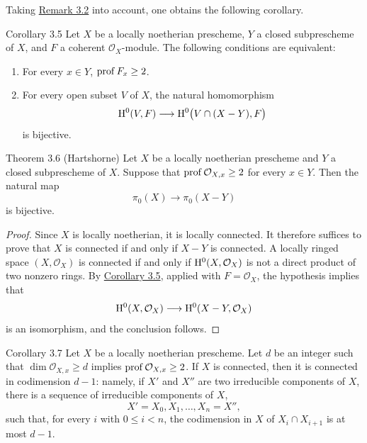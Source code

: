 Taking \hyperref[III.3.2]{Remark 3.2} into account, one obtains the following corollary.


\begin{sgastatement}{Corollary 3.5}
Let $X$ be a locally noetherian prescheme, $Y$ a closed subprescheme of $X$,
and $F$ a coherent $\mathcal O_X$-module. The following conditions are equivalent:
\begin{enumerate}[label=\textup{(\arabic*)},leftmargin=2.8em]
\item For every $x\in Y$, $\operatorname{prof} F_x\ge2$.
\item For every open subset $V$ of $X$, the natural homomorphism
\[
  \mathrm H^0(V,F)\longrightarrow\mathrm H^0\bigl(V\cap(X-Y),F\bigr)
\]
is bijective.
\end{enumerate}
\end{sgastatement}

\begin{sgastatement}{Theorem 3.6 (Hartshorne)}
Let $X$ be a locally noetherian prescheme and $Y$ a closed subprescheme of
$X$. Suppose that $\operatorname{prof}\mathcal O_{X,x}\ge2$ for every $x\in Y$. Then the
natural map
\[
  \pi_0(X)\longrightarrow\pi_0(X-Y)
\]
is bijective.
\end{sgastatement}

\begin{proof}
Since $X$ is locally noetherian, it is locally connected. It therefore
suffices to prove that $X$ is connected if and only if $X-Y$ is connected.
A locally ringed space $(X,\mathcal O_X)$ is connected if and only if
$\mathrm H^0(X,\mathcal O_X)$ is not a direct product of two nonzero rings. By
\hyperref[III.3.5]{Corollary 3.5}, applied with $F=\mathcal O_X$, the hypothesis implies that
\[
  \mathrm H^0(X,\mathcal O_X)\longrightarrow
  \mathrm H^0(X-Y,\mathcal O_X)
\]
is an isomorphism, and the conclusion follows.
\end{proof}


\begin{sgastatement}{Corollary 3.7}
Let $X$ be a locally noetherian prescheme. Let $d$ be an integer such that
$\dim\mathcal O_{X,x}\ge d$ implies $\operatorname{prof}\mathcal O_{X,x}\ge2$. If $X$ is
connected, then it is connected in codimension $d-1$: namely, if $X'$ and
$X''$ are two irreducible components of $X$, there is a sequence of
irreducible components of $X$,
\[
  X'=X_0,X_1,\ldots,X_n=X'',
\]
such that, for every $i$ with $0\le i<n$, the codimension in $X$ of
$X_i\cap X_{i+1}$ is at most $d-1$.
\end{sgastatement}

